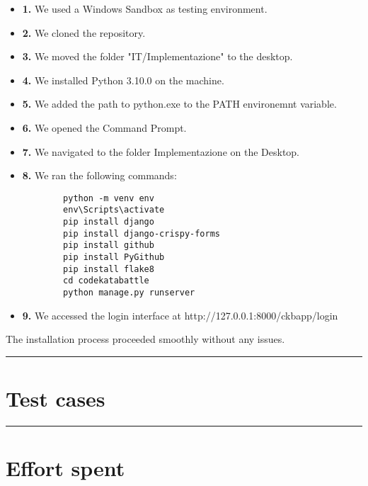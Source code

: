 \documentclass{Configuration_Files/Template}
\begin{document}
\begin{itemize}

    \item \textbf{1.} We used a Windows Sandbox as testing environment.
    \item \textbf{2.} We cloned the repository.
    \item \textbf{3.} We moved the folder "IT/Implementazione" to the desktop.
    \item \textbf{4.} We installed Python 3.10.0 on the machine.
    \item \textbf{5.} We added the path to python.exe to the PATH environemnt variable.
    \item \textbf{6.} We opened the Command Prompt.
    \item \textbf{7.} We navigated to the folder Implementazione on the Desktop.
    \item \textbf{8.} We ran the following commands:

    \begin{lstlisting}
        python -m venv env
        env\Scripts\activate
        pip install django
        pip install django-crispy-forms
        pip install github
        pip install PyGithub
        pip install flake8
        cd codekatabattle
        python manage.py runserver 
    \end{lstlisting}

    \item \textbf{9.} We accessed the login interface at http://127.0.0.1:8000/ckbapp/login
    
\end{itemize}

The installation process proceeded smoothly without any issues.

{\color{bluepoli}\rule{\linewidth}{0.1pt}}

\chapter{Test cases}



{\color{bluepoli}\rule{\linewidth}{0.1pt}}

\chapter{Effort spent}
\end{document}
